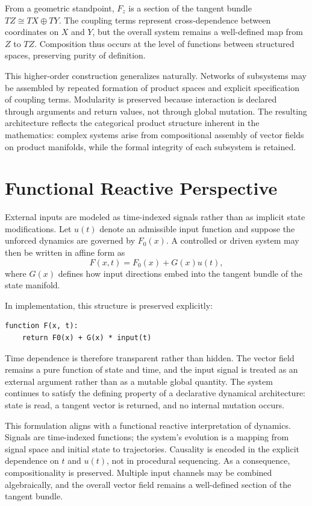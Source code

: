 \documentclass[12pt]{book}
\begin{document}
From a geometric standpoint, $F_z$ is a section of the tangent bundle
$TZ \cong TX \oplus TY$. The coupling terms represent cross-dependence
between coordinates on $X$ and $Y$, but the overall system remains a
well-defined map from $Z$ to $TZ$. Composition thus occurs at the level
of functions between structured spaces, preserving purity of definition.

This higher-order construction generalizes naturally. Networks of
subsystems may be assembled by repeated formation of product spaces
and explicit specification of coupling terms. Modularity is preserved
because interaction is declared through arguments and return values,
not through global mutation. The resulting architecture reflects the
categorical product structure inherent in the mathematics: complex
systems arise from compositional assembly of vector fields on product
manifolds, while the formal integrity of each subsystem is retained.

\section{Functional Reactive Perspective}

External inputs are modeled as time-indexed signals rather than as
implicit state modifications. Let $u(t)$ denote an admissible input
function and suppose the unforced dynamics are governed by $F_0(x)$.
A controlled or driven system may then be written in affine form as
\[
F(x,t) = F_0(x) + G(x)u(t),
\]
where $G(x)$ defines how input directions embed into the tangent
bundle of the state manifold.

In implementation, this structure is preserved explicitly:

\begin{verbatim}
function F(x, t):
    return F0(x) + G(x) * input(t)
\end{verbatim}

Time dependence is therefore transparent rather than hidden. The
vector field remains a pure function of state and time, and the input
signal is treated as an external argument rather than as a mutable
global quantity. The system continues to satisfy the defining property
of a declarative dynamical architecture: state is read, a tangent
vector is returned, and no internal mutation occurs.

This formulation aligns with a functional reactive interpretation of
dynamics. Signals are time-indexed functions; the system's evolution
is a mapping from signal space and initial state to trajectories.
Causality is encoded in the explicit dependence on $t$ and $u(t)$,
not in procedural sequencing. As a consequence, compositionality is
preserved. Multiple input channels may be combined algebraically,
and the overall vector field remains a well-defined section of the
tangent bundle.
\end{document}
